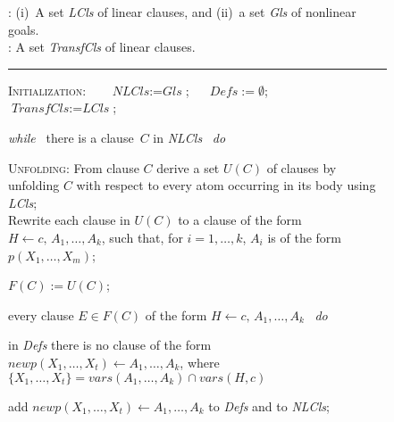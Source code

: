 \documentclass[english]{tlp}
\begin{document}
\begin{figure}[ht]
\vspace{-3mm}

\noindent\hrulefill
\begin{flushleft}\vspace{-2mm}
: (i)~A set \textit{LCls} of linear clauses, 
and (ii)~a set \textit{Gls} of nonlinear goals.\\ 
: A set \textit{TransfCls} of linear clauses.

\vspace*{-2mm}
\rule{30mm}{0.1mm}

\noindent \textsc{Initialization}:~~~
$\textit{NLCls}:= \textit{Gls}$;
~ ~$\textit{Defs}:= \emptyset$;
~ ~$\textit{TransfCls}:= \textit{LCls}$;


\smallskip

\noindent \textit{while}~ there is a clause~$C$ in \textit{NLCls}
~\textit{do}


\smallskip
\hspace*{3mm}\begin{minipage}{124mm} 

\hangindent=3mm
\noindent \textsc{Unfolding}: From clause $C$ derive a set $\textit{U}(C)$ of clauses by
unfolding $C$ with respect to every atom occurring
in its body using \textit{LCls}; \\
Rewrite each clause in $\textit{U}(C)$ to a clause of the form 
 $H \leftarrow c,\, A_1, \ldots, A_k$, such that, for $i=1,\ldots,k$, $A_i$ is of the form
$p(X_1,\ldots,X_m)$;

\smallskip
\hangindent=3mm

\noindent
\hspace*{3mm}$F(C) := U(C)$;

\hangindent=3mm
\noindent
\hspace*{3mm} every clause $E\in F(C)$ of the form  $H \leftarrow c,\, A_1, \ldots, A_k$ \ {\it do}

\hangindent=11.5mm
\noindent
\hspace*{8mm}{\it if} in \textit{Defs} there is no
clause of the form  $\textit{newp}(X_1,\ldots,X_t) \leftarrow A_1, \ldots, A_k$,
where $\{X_1,\ldots,X_t\} = \textit{vars}(A_1, \ldots, A_k) \cap \textit{vars}(H,c)$

\noindent
\hangindent=18mm
\hspace*{8mm}{\it then} add $\textit{newp}(X_1,\ldots,X_t) \leftarrow A_1, \ldots, A_k$ to \textit{Defs} and to \textit{NLCls}; 


\end{minipage}
\end{flushleft}
\end{figure}
\end{document}
